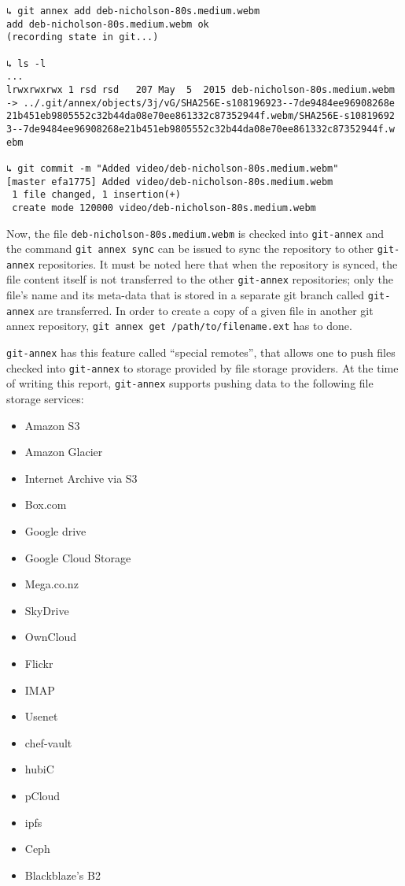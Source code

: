 {\small
\begin{verbatim}
↳ git annex add deb-nicholson-80s.medium.webm
add deb-nicholson-80s.medium.webm ok
(recording state in git...)

↳ ls -l
...
lrwxrwxrwx 1 rsd rsd   207 May  5  2015 deb-nicholson-80s.medium.webm
-> ../.git/annex/objects/3j/vG/SHA256E-s108196923--7de9484ee96908268e
21b451eb9805552c32b44da08e70ee861332c87352944f.webm/SHA256E-s10819692
3--7de9484ee96908268e21b451eb9805552c32b44da08e70ee861332c87352944f.w
ebm

↳ git commit -m "Added video/deb-nicholson-80s.medium.webm"
[master efa1775] Added video/deb-nicholson-80s.medium.webm
 1 file changed, 1 insertion(+)
 create mode 120000 video/deb-nicholson-80s.medium.webm
\end{verbatim}
}

Now, the file \verb+deb-nicholson-80s.medium.webm+ is checked into
\verb+git-annex+ and the command \verb+git annex sync+ can be issued
to sync the repository to other \verb+git-annex+ repositories. It must
be noted here that when the repository is synced, the file content
itself is not transferred to the other \verb+git-annex+ repositories;
only the file's name and its meta-data that is stored in a separate
git branch called \verb+git-annex+ are
transferred\cite{documentation:git-annex-hworks}. In order to create a
copy of a given file in another git annex repository,
\verb+git annex get /path/to/filename.ext+ has to done.

\verb+git-annex+ has this feature called ``special
remotes''\cite{documentation:git-annex-sremotes}, that allows one to
push files checked into \verb+git-annex+ to storage provided by file
storage providers. At the time of writing this report,
\verb+git-annex+ supports pushing data to the following file storage
services:

{\scriptsize
  \begin{itemize}
  \item Amazon S3
  \item Amazon Glacier
  \item Internet Archive via S3
  \item Box.com
  \item Google drive
  \item Google Cloud Storage
  \item Mega.co.nz
  \item SkyDrive
  \item OwnCloud
  \item Flickr
  \item IMAP
  \item Usenet
  \item chef-vault
  \item hubiC
  \item pCloud
  \item ipfs
  \item Ceph
  \item Blackblaze's B2
  \end{itemize}
}

